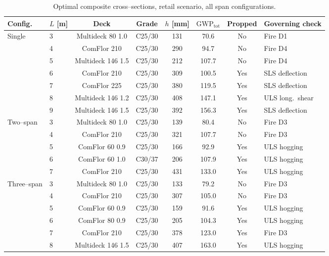 \begin{table}[h!]
\small\centering
\caption{Optimal composite cross--sections, retail scenario, all span configurations.}
\label{tab:retail_optima}
\begin{tabular}{llcccccl}
\toprule
Config. & $L$ [m] & Deck & Grade & $h$ [mm] & $\mathrm{GWP}_\mathrm{tot}$ & Propped & Governing check \\
\midrule
\multirow{7}{*}{Single}
 & 3 & Multideck 80 1.0  & C25/30 & 131 & 70.6  & No  & Fire D1 \\
 & 4 & ComFlor 210       & C25/30 & 290 & 94.7  & No  & Fire D4 \\
 & 5 & Multideck 146 1.5 & C25/30 & 212 & 107.7 & No  & Fire D4 \\
 & 6 & ComFlor 210       & C25/30 & 309 & 100.5 & Yes & SLS deflection \\
 & 7 & ComFlor 225       & C25/30 & 380 & 119.5 & Yes & SLS deflection \\
 & 8 & Multideck 146 1.2 & C25/30 & 408 & 147.1 & Yes & ULS long.\ shear \\
 & 9 & Multideck 146 1.5 & C25/30 & 392 & 156.3 & Yes & SLS deflection \\
\midrule
\multirow{5}{*}{Two--span}
 & 3 & Multideck 80 1.0  & C25/30 & 139 & 80.4  & No  & Fire D3 \\
 & 4 & ComFlor 210       & C25/30 & 321 & 107.7 & No  & Fire D3 \\
 & 5 & ComFlor 60 0.9    & C25/30 & 166 & 92.9  & Yes & ULS hogging \\
 & 6 & ComFlor 60 1.0    & C30/37 & 206 & 107.9 & Yes & ULS hogging \\
 & 7 & ComFlor 210       & C25/30 & 431 & 133.0 & Yes & ULS hogging \\
\midrule
\multirow{6}{*}{Three--span}
 & 3 & Multideck 80 1.0  & C25/30 & 133 & 79.2  & No  & Fire D3 \\
 & 4 & ComFlor 210       & C25/30 & 307 & 105.0 & No  & Fire D3 \\
 & 5 & ComFlor 60 0.9    & C25/30 & 159 & 91.6  & Yes & ULS hogging \\
 & 6 & ComFlor 80 0.9    & C25/30 & 205 & 104.3 & Yes & ULS hogging \\
 & 7 & ComFlor 210       & C25/30 & 378 & 123.0 & Yes & Fire D3 \\
 & 8 & Multideck 146 1.5 & C25/30 & 407 & 163.0 & Yes & ULS hogging \\
\bottomrule
\end{tabular}
\end{table}

